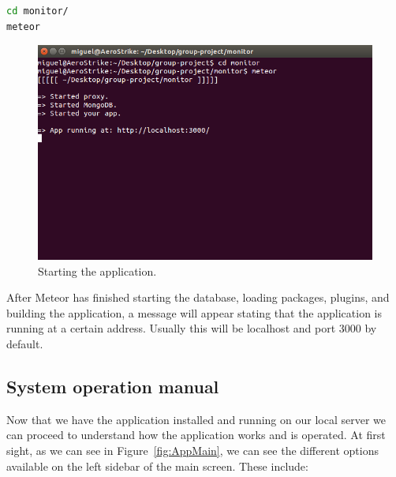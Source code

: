 \documentclass{article}
\begin{document}
\vspace{5mm} %

\begin{lstlisting}[language=sh]
cd monitor/
meteor
\end{lstlisting}

\vspace{5mm} %

\begin{figure}[h!]
  \centering
    \includegraphics[scale=0.6]{images/app_running.png}
  \caption{Starting the application.}
\end{figure}


\vspace{2mm} %

After Meteor has finished starting the database, loading packages, plugins, and building the application, a message will appear stating that the application is running at a certain address. Usually this will be localhost and port 3000 by default. 




\subsection{System operation manual}

Now that we have the application installed and running on our local server we can proceed to understand how the application works and is operated. At first sight, as we can see in Figure~\ref{fig:AppMain}, we can see the different options available on the left sidebar of the main screen. These include:
\end{document}
